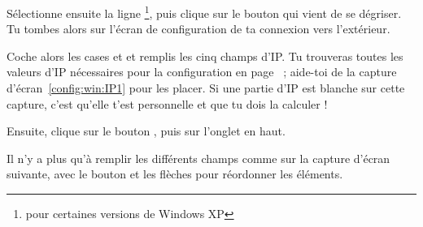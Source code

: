 

Sélectionne ensuite la ligne 
\footnote{ pour certaines versions de Windows XP},
puis clique sur le bouton  qui vient de se
dégriser. Tu tombes alors sur l'écran de configuration de ta
connexion vers l'extérieur.

Coche alors les cases  et  et remplis les cinq champs d'IP. Tu
trouveras toutes les valeurs d'IP nécessaires pour la configuration en page~\pageref{tableau:mon_IP} ; aide-toi de la capture
d'écran~\ref{config:win:IP1} pour les placer. Si une partie d'IP est blanche sur cette capture, c'est qu'elle t'est personnelle et que tu dois la
calculer !

Ensuite, clique sur le bouton , puis sur l'onglet
 en haut.


Il n'y a plus qu'à remplir les différents champs comme sur la
capture d'écran suivante, avec le bouton  et les
flèches pour réordonner les éléments.




